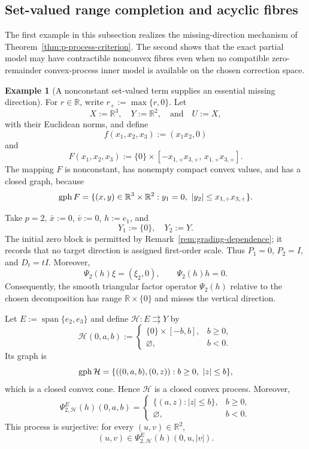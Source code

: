 \documentclass[11pt]{amsart}
\theoremstyle{definition}
\newtheorem{example}[theorem]{Example}
\theoremstyle{remark}
\newcommand{\tto}{\rightrightarrows}
\newcommand{\bx}{\bar x}
\newcommand{\bv}{\bar v}
\newcommand{\R}{\mathbb R}
\newcommand{\gph}{\mathop{\rm gph}\nolimits}
\begin{document}
	
	\subsection{Set-valued range completion and acyclic fibres}
	
	The first example in this subsection realizes the missing-direction
	mechanism of Theorem~\ref{thm:p-process-criterion}. The second shows that
	the exact partial model may have contractible nonconvex fibres even when
	no compatible zero-remainder convex-process inner model is available on
	the chosen correction space.
	
	\begin{example}[A nonconstant set-valued term supplies an essential
		missing direction]
		\label{ex:set-valued-missing-directions}
		For $r\in\R$, write $r_+:=\max\{r,0\}$. Let
		$$
		X:=\R^3,\quad Y:=\R^2,\quad\text{and}\quad U:=X,
		$$
		with their Euclidean norms, and define
		$$
		f(x_1,x_2,x_3):=(x_1x_2,0)
		$$
		and
		\begin{equation}
			F(x_1,x_2,x_3)
			:=
			\{0\}\times
			[-x_{1,+}x_{3,+},\,x_{1,+}x_{3,+}].
			\label{eq:nonconstant-F}
		\end{equation}
		The mapping $F$ is nonconstant, has nonempty compact convex values,
		and has a closed graph, because
		$$
		\gph F
		=
		\{(x,y)\in\R^3\times\R^2:
		y_1=0,\ |y_2|\le x_{1,+}x_{3,+}\}.
		$$
		
		Take $p=2$, $\bx:=0$, $\bv:=0$, $h:=e_1$, and
		$$
		Y_1:=\{0\},\quad Y_2:=Y.
		$$
		The initial zero block is permitted by
		Remark~\ref{rem:grading-dependence}; it records that no target direction
		is assigned first-order scale.
		Thus $P_1=0$, $P_2=I$, and $D_t=tI$. Moreover,
		$$
		\Psi_2(h)\xi=(\xi_2,0),
		\qquad
		\Psi_2(h)h=0.
		$$
		Consequently, the smooth triangular factor operator $\Psi_2(h)$ relative to
		the chosen decomposition has range
		$\R\times\{0\}$ and misses the vertical direction.
		
		Let $E:=\operatorname{span}\{e_2,e_3\}$ and define
		$\mathcal H:E\tto Y$ by
		$$
		\mathcal H(0,a,b)
		:=
		\begin{cases}
			\{0\}\times[-b,b],&b\ge0,\\
			\varnothing,&b<0.
		\end{cases}
		$$
		Its graph is
		$$
		\gph\mathcal H
		=
		\{((0,a,b),(0,z)):b\ge0,\ |z|\le b\},
		$$
		which is a closed convex cone. Hence $\mathcal H$ is a closed convex
		process. Moreover,
		$$
		\Psi_{2,\mathcal H}^{E}(h)(0,a,b)
		=
		\begin{cases}
			\{(a,z):|z|\le b\},&b\ge0,\\
			\varnothing,&b<0.
		\end{cases}
		$$
		This process is surjective: for every $(u,v)\in\R^2$,
		$$
		(u,v)\in
		\Psi_{2,\mathcal H}^{E}(h)(0,u,|v|).
		$$
		

\end{example}
\end{document}
